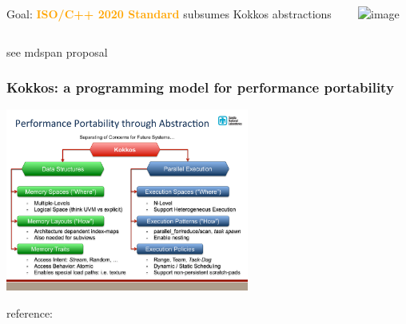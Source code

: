 \begin{frame}
{\begin{itemize}
    \end{itemize}
  }
  \begin{columns}
    \begin{column}{0.34\linewidth}
      Goal: \textcolor{orange}{\textbf{ISO/C++ 2020 Standard}} subsumes Kokkos abstractions
    \end{column}
    \begin{column}{0.65\linewidth}
      \begin{center}
        \includegraphics<1-2>[width=5cm]{doc/perf_portability/kokkos_summary}
      \end{center}
    \end{column}
  \end{columns}
  \vfill
  {\scriptsize see mdspan proposal }
\end{frame}

\begin{frame}
  \frametitle{Kokkos: a programming model for performance portability}

  \begin{center}
    \includegraphics[width=8.0cm]{../intro/images/Kokkos-Multi-CoE_slide3}
  \end{center}

  {\small reference: }

\end{frame}

